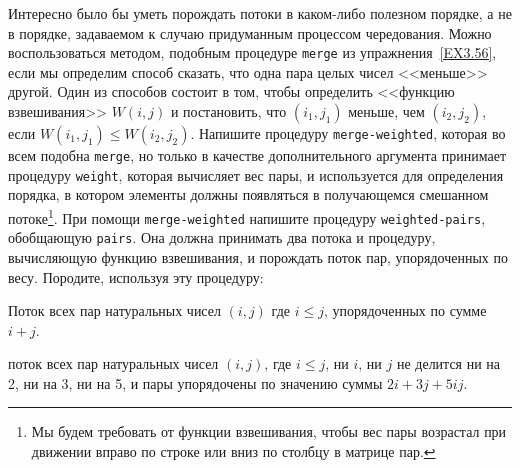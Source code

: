 \begin{exercise}{3.70}\label{EX3.70}%
Интересно было бы уметь порождать потоки в каком-либо
полезном порядке, а не в порядке, задаваемом к случаю придуманным
процессом чередования.  Можно воспользоваться методом, подобным
процедуре {\tt merge} из упражнения~\ref{EX3.56},
если мы определим способ сказать, что одна пара целых чисел <<меньше>>
другой.  Один из способов состоит в том, чтобы определить <<функцию
взвешивания>> $W(i,j)$ и постановить, что $(i_1,
j_1)$ меньше, чем $(i_2, j_2)$, если
$W(i_1, j_1) \leq W(i_2, j_2)$.  Напишите процедуру
{\tt merge-weighted},
которая во всем подобна
{\tt merge}, но только в качестве дополнительного аргумента
принимает процедуру {\tt weight}, которая вычисляет вес пары, и
используется для определения порядка, в котором элементы должны
появляться в получающемся смешанном потоке\footnote{Мы будем требовать от функции взвешивания, чтобы вес пары возрастал при движении вправо по строке или вниз
по столбцу в матрице пар.
}.
При помощи {\tt merge-weighted} напишите процедуру
{\tt weighted-pairs}, обобщающую {\tt pairs}. Она должна
принимать два потока и процедуру, вычисляющую функцию взвешивания, и
порождать поток пар, упорядоченных по весу.  Породите, используя эту
процедуру:
\begin{plainenum}
\item
Поток всех пар натуральных чисел $(i,j)$ где
$ i \leq j $, упорядоченных по сумме $i+j$.

\item
 поток всех пар натуральных чисел
$(i,j)$, где $i \leq j$, ни $i$, ни
$j$ не делится ни на 2, ни на 3, ни на 5, и пары
упорядочены по значению суммы $2i + 3j + 5ij$.
\end{plainenum}
\end{exercise}
